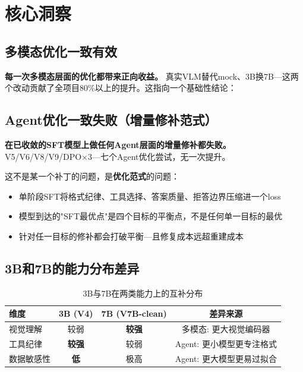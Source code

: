 \documentclass[fontset=none,11pt,a4paper]{ctexart}
\begin{document}
\section{核心洞察}

\subsection{多模态优化一致有效}

\textbf{每一次多模态层面的优化都带来正向收益。} 真实VLM替代mock、3B换7B---这两个改动贡献了全项目80\%以上的提升。这指向一个基础性结论：

\begin{center}
\end{center}

\subsection{Agent优化一致失败（增量修补范式）}

\textbf{在已收敛的SFT模型上做任何Agent层面的增量修补都失败。} V5/V6/V8/V9/DPO×3---七个Agent优化尝试，无一次提升。

这不是某一个补丁的问题，是\textbf{优化范式}的问题：

\begin{itemize}[nosep]
    \item 单阶段SFT将格式纪律、工具选择、答案质量、拒答边界压缩进一个loss
    \item 模型到达的"SFT最优点"是四个目标的平衡点，不是任何单一目标的最优
    \item 针对任一目标的修补都会打破平衡---且修复成本远超重建成本
\end{itemize}

\subsection{3B和7B的能力分布差异}

\begin{table}[htbp]
\centering
\begin{tabular}{lccc}
\toprule
维度 & 3B (V4) & 7B (V7B-clean) & 差异来源 \\
\midrule
视觉理解 & 较弱 & \textbf{较强} & 多模态: 更大视觉编码器 \\
工具纪律 & \textbf{较强} & 较弱 & Agent: 更小模型更专注格式 \\
数据敏感性 & \textbf{低} & 极高 & Agent: 更大模型更易过拟合 \\
\bottomrule
\end{tabular}
\caption{3B与7B在两类能力上的互补分布}
\label{tab:3b7b}
\end{table}
\end{document}
